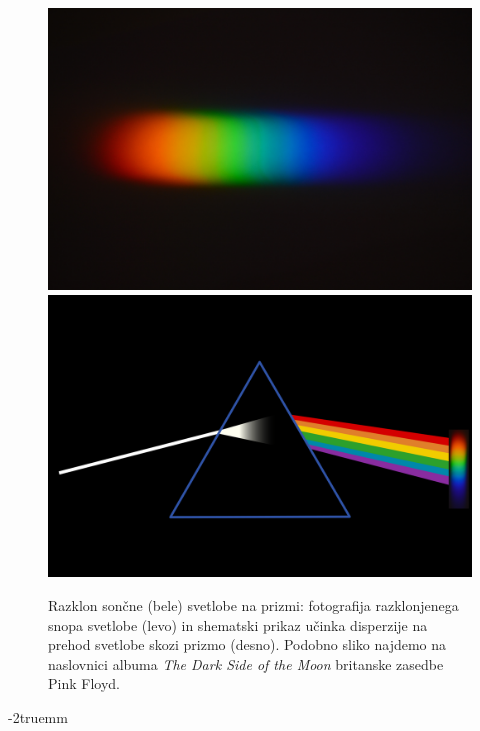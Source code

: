 \begin{figure}[htp]
\centering
\includegraphics[width=7truecm]{slike/09_prizma.jpg}\hfill
\includegraphics[width=7truecm]{slike/09_prizma_disp.png}
\caption{Razklon sončne (bele) svetlobe na prizmi: fotografija razklonjenega
snopa svetlobe (levo) in shematski prikaz učinka disperzije na prehod svetlobe
skozi prizmo (desno). Podobno sliko najdemo na naslovnici albuma 
{\it The Dark Side of the Moon} britanske zasedbe Pink Floyd.}
\label{fig:09_prizma}
\end{figure}
\vglue-2truemm
